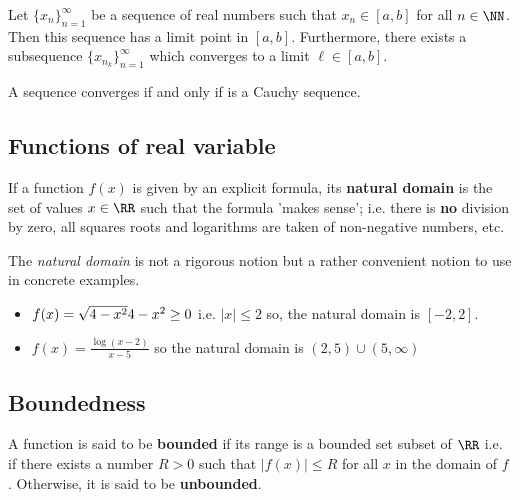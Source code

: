 \documentclass[12pt, a4paper]{article}
\begin{document}
\begin{mdthm}
    Let \(\{x_n\}_{n=1}^{\infty}\) be a sequence of real numbers such that \(x_n \in [a,b]\) for all \(n \in \NN\). Then this sequence has a limit point in \([a,b]\). Furthermore, there exists a subsequence \(\{x_{n_k}\}^{\infty}_{n=1}\) which converges to a limit \(\ell \in [a,b]\).
\end{mdthm}

\begin{mdthm}
A sequence converges if and only if is a Cauchy sequence.
\end{mdthm}

\subsection{Functions of real variable}

\begin{definition}
    If a function \(f(x)\) is given by an explicit formula, its \textbf{natural domain} is the set of values \(x\in \RR\) such that the formula 'makes sense'; i.e. there is \textbf{no} division by zero, all squares roots and logarithms are taken of non-negative numbers, etc.
\end{definition}

\begin{mdremark}
    The \textit{natural domain} is not a rigorous notion but a rather convenient notion to use in concrete examples.
\end{mdremark}

\begin{example}
    \hphantom{wahoo}
    \begin{itemize}
        \item \(f(x)=\sqrt{4-x^2} \\ 4-x^2 \geq 0\) i.e. \(|x| \leq 2\) so, the natural domain is \([-2,2]\).
        \item \(f(x)=\frac{\log(x-2)}{x-5}\) so the natural domain is \((2,5) \cup (5,\infty)\)
    \end{itemize}
\end{example}

\subsection{Boundedness}

\begin{definition}
    A function is said to be \textbf{bounded} if its range is a bounded set subset of \(\RR\) i.e. if there exists a number \(R>0\) such that \(|f(x)| \leq R \) for all \(x\) in the domain of \(f\). Otherwise, it is said to be \textbf{unbounded}.
\end{definition}
\end{document}
